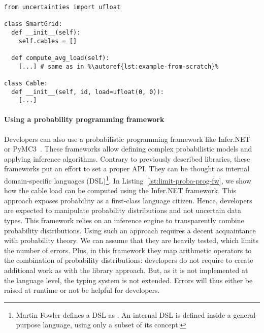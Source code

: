 %
%
%
\begin{lstlisting}[style=pythonStyle, caption=Managing uncertainty in Python using uncertainties~\cite{url:uncertainties}, label=lst:example-python-uncertainties, linewidth=0.97\textwidth, escapechar=\%]
from uncertainties import ufloat

class SmartGrid:
  def __init__(self):
    self.cables = []

  def compute_avg_load(self):
    [...] # same as in %\autoref{lst:example-from-scratch}%

class Cable:
  def __init__(self, id, load=ufloat(0, 0)):
    [...]
\end{lstlisting}

\paragraph{Using a probability programming framework}
Developers can also use a probabilistic programming framework like Infer.NET~\cite{url:InferNET18} or PyMC3~\cite{DBLP:journals/peerj-cs/SalvatierWF16}.
These frameworks allow defining complex probabilistic models and applying inference algorithms.
Contrary to previously described libraries, these frameworks put an effort to set a proper API.
They can be thought as internal domain-specific languages (DSL)\cite{fowler2010domain}\footnote{Martin Fowler defines a DSL as \cite{fowler2010domain}. An internal DSL is defined inside a general-purpose language, using only a subset of its concept.}.
In Listing~\ref{lst:limit-proba-prog-fw}, we show how the cable load can be computed using the Infer.NET framework.
This approach exposes probability as a first-class language citizen. 
Hence, developers are expected to manipulate probability distributions and not uncertain data types. 
This framework relies on an inference engine to transparently combine probability distributions.
Using such an approach requires a decent acquaintance with probability theory.
We can assume that they are heavily tested, which limits the number of errors.
Plus, in this framework they map arithmetic operators to the combination of probability distributions: developers do not require to create additional work as with the library approach.
But, as it is not implemented at the language level, the typing system is not extended.
Errors will thus either be raised at runtime or not be helpful for developers.

